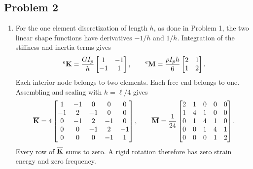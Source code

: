 \documentclass[12pt]{article}
\begin{document}
\subsection*{Problem 2}
\begin{enumerate}
    \item For the one element discretization of length $h$, as done in Problem 1, the two linear shape functions have derivatives $-1/h$ and $1/h$. Integration of the stiffness and inertia terms gives
          \[
              {}^e\mathbf{K}=\frac{GI_p}{h}\begin{bmatrix}1&-1\\-1&1\end{bmatrix},
              \qquad  {}^e\mathbf{M}=\frac{\rho I_ph}{6}\begin{bmatrix}2&1\\1&2\end{bmatrix}.
          \]
          Each interior node belongs to two elements. Each free end belongs to one. Assembling and scaling with $h=\ell/4$ gives
          \[
              \overline{\mathbf K}=4\begin{bmatrix}1&-1&0&0&0\\-1&2&-1&0&0\\0&-1&2&-1&0\\
                  0&0&-1&2&-1\\0&0&0&-1&1\end{bmatrix},\qquad
              \overline{\mathbf M}=\frac1{24}\begin{bmatrix}2&1&0&0&0\\1&4&1&0&0\\0&1&4&1&0\\
                  0&0&1&4&1\\0&0&0&1&2\end{bmatrix}.
          \]
          Every row of $\overline{\mathbf K}$ sums to zero. A rigid rotation therefore has zero strain energy and zero frequency.


\end{enumerate}
\end{document}
